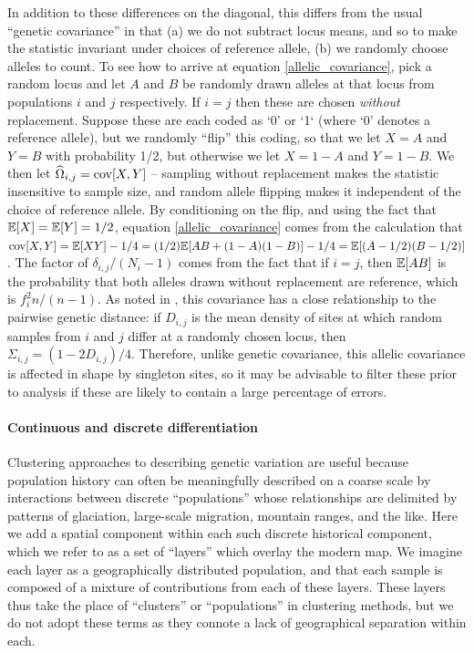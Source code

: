 \documentclass[12pt]{article}
\begin{document}
In addition to these differences on the diagonal,
this differs from the usual ``genetic covariance'' \citep{mcvean_genealogical_2009}
in that (a) we do not subtract locus means,
and so to make the statistic invariant under choices of reference allele, 
(b) we randomly choose alleles to count.
To see how to arrive at equation \eqref{allelic_covariance},
pick a random locus and
let $A$ and $B$ be randomly drawn alleles at that locus from populations $i$ and $j$ respectively.
If $i=j$ then these are chosen \emph{without} replacement.
Suppose these are each coded as `0' or `1` (where `0' denotes a reference allele),
but we randomly ``flip'' this coding, so that we let $X=A$ and $Y=B$ with probability 1/2,
but otherwise we let $X=1-A$ and $Y=1-B$.
We then let $\widehat{\Omega}_{i,j} = \mathop{\mbox{cov}}[X,Y]$ --
sampling without replacement makes the statistic insensitive to sample size,
and random allele flipping makes it independent of the choice of reference allele.
By conditioning on the flip,
and using the fact that $\mathbb{E}[X] = \mathbb{E}[Y] = 1/2$,
equation \eqref{allelic_covariance} comes from the calculation that
$\mathop{\mbox{cov}}[X,Y] = \mathbb{E}[XY] - 1/4 = (1/2)\mathbb{E}[AB + (1-A)(1-B)] - 1/4 = \mathbb{E}[(A-1/2)(B-1/2)]$.
The factor of $\delta_{i,j}/(N_i-1)$ comes from the fact that if $i=j$,
then $\mathbb{E}[AB]$ is the probability that both alleles drawn without replacement are reference,
which is $f_i^2 n/(n-1)$.
As noted in \cite{EEMS},
this covariance has a close relationship to the pairwise genetic distance:
if $D_{i,j}$ is the mean density of sites at which random samples from $i$ and $j$ differ at a randomly chosen locus,
then $\Sigma_{i,j} = (1 - 2 D_{i,j})/4$.
Therefore, unlike genetic covariance,
this allelic covariance is affected in shape by singleton sites,
so it may be advisable to filter these prior to analysis
if these are likely to contain a large percentage of errors.




\paragraph{Continuous and discrete differentiation}
Clustering approaches to describing genetic variation
are useful because population history can often be meaningfully described on a coarse scale
by interactions between discrete ``populations''
whose relationships are delimited by patterns of glaciation,
large-scale migration,
mountain ranges, and the like.
Here we add a spatial component within each such discrete historical component,
which we refer to as a set of ``layers'' which overlay the modern map.
We imagine each layer as a geographically distributed population,
and that each sample is composed of a mixture of contributions from each of these layers.
These layers thus take the place of ``clusters'' or ``populations'' in clustering methods,
but we do not adopt these terms as they connote a lack of geographical separation within each.
\end{document}
